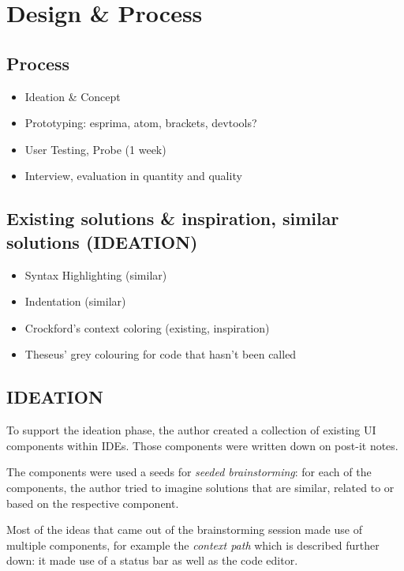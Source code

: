 \chapter{Design \& Process}\label{design-process}

\section{Process}\label{process}

\begin{itemize}
\itemsep1pt\parskip0pt
\item
  Ideation \& Concept
\item
  Prototyping: esprima, atom, brackets, devtools?
\item
  User Testing, Probe (1 week)
\item
  Interview, evaluation in quantity and quality
\end{itemize}

\section{Existing solutions \& inspiration, similar solutions
(IDEATION)}\label{existing-solutions-inspiration-similar-solutions-ideation}

\begin{itemize}
\itemsep1pt\parskip0pt
\item
  Syntax Highlighting (similar)
\item
  Indentation (similar)
\item
  Crockford’s context coloring (existing, inspiration)
\item
  Theseus’ grey colouring for code that hasn’t been called
\end{itemize}

\section{IDEATION}\label{ideation}

To support the ideation phase, the author created a collection of
existing UI components within IDEs. Those components were written down
on post-it notes.

The components were used a seeds for \emph{seeded brainstorming}: for
each of the components, the author tried to imagine solutions that are
similar, related to or based on the respective component.

Most of the ideas that came out of the brainstorming session made use of
multiple components, for example the \emph{context path} which is
described further down: it made use of a status bar as well as the code
editor.

